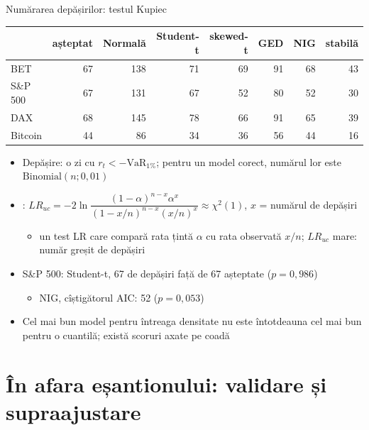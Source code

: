 \begin{frame}{Numărarea depășirilor: testul Kupiec}
\itemsize{\footnotesize}
\begin{center}
\scriptsize
\begin{tabular}{lrrrrrrr}
\toprule
& așteptat & Normală & Student-t & skewed-t & GED & NIG & stabilă \\
\midrule
BET & 67 & 138 & 71 & 69 & 91 & 68 & 43 \\
S\&P 500 & 67 & 131 & 67 & 52 & 80 & 52 & 30 \\
DAX & 68 & 145 & 78 & 66 & 91 & 65 & 39 \\
Bitcoin & 44 & 86 & 34 & 36 & 56 & 44 & 16 \\
\bottomrule
\end{tabular}
\end{center}
\begin{itemize}
    \item Depășire: o zi cu $r_t < -\mathrm{VaR}_{1\%}$; pentru un model corect, numărul lor este $\mathrm{Binomial}(n; 0{,}01)$
    \item {}: $LR_{uc} = -2\ln\dfrac{(1-\alpha)^{n - x}\alpha^x}{(1 - x/n)^{n - x}(x/n)^x} \approx \chi^2(1)$, $x$ = numărul de depășiri
    \begin{itemize}
        \item un test LR care compară rata țintă $\alpha$ cu rata observată $x/n$; $LR_{uc}$ mare: număr greșit de depășiri
    \end{itemize}
    \item S\&P 500: Student-t, 67 de depășiri față de 67 așteptate ($p = 0{,}986$)
    \begin{itemize}
        \item NIG, cîștigătorul AIC: 52 ($p = 0{,}053$)
    \end{itemize}
    \item Cel mai bun model pentru întreaga densitate nu este întotdeauna cel mai bun pentru o cuantilă; există scoruri axate pe coadă 
\end{itemize}
\end{frame}


\section{În afara eșantionului: validare și supraajustare}

